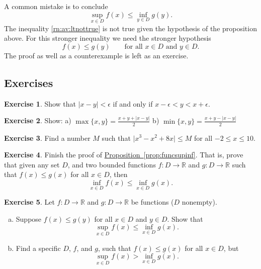 \documentclass[12pt]{book}
\newcommand{\sabs}[1]{\lvert {#1} \rvert}
\newcommand{\abs}[1]{\left\lvert {#1} \right\rvert}
\newcommand{\R}{{\mathbb{R}}}
\theoremstyle{plain}
\theoremstyle{remark}
\theoremstyle{definition}
\theoremstyle{exercise}
\newtheorem{exercise}{Exercise}[section]
\theoremstyle{example}
\newcommand{\propref}[1]{\hyperref[#1]{Proposition~\ref*{#1}}}
\begin{document}
\medskip

A common mistake is to conclude 
\begin{equation} \label{rn:av:ltnottrue}
\sup_{x \in D} f(x) \leq \inf_{y \in D} g(y) .
\end{equation}
The inequality \eqref{rn:av:ltnottrue} is not true given the hypothesis of
the proposition above.  For this stronger
inequality we need the stronger hypothesis
\begin{equation*}
f(x) \leq g(y) \qquad \text{for all $x \in D$ and $y \in D$.}
\end{equation*}
The proof as well as a counterexample is left as an exercise.

\subsection{Exercises}

\begin{exercise}
Show that
$\abs{x-y} < \epsilon$ if and only if $x-\epsilon < y < x+\epsilon$.
\end{exercise}

\begin{exercise}
Show: \qquad
a)
$\max \{x,y\} = \frac{x+y+\abs{x-y}}{2}$
\qquad
b)
$\min \{x,y\} = \frac{x+y-\abs{x-y}}{2}$
\end{exercise}

\begin{exercise}
Find a number $M$ such that $\sabs{x^3-x^2+8x} \leq M$ for all $-2 \leq x \leq
10$.
\end{exercise}

\begin{exercise}
Finish the proof of \propref{prop:funcsupinf}.
That is, prove that
given any set $D$,
and two bounded functions
$f \colon D \to \R$ and $g \colon D \to \R$ 
such that $f(x) \leq g(x)$ for all $x \in D$, then 
\begin{equation*}
\inf_{x\in D} f(x) \leq \inf_{x\in D} g(x) .
\end{equation*}
\end{exercise}

\begin{exercise}
Let 
$f \colon D \to \R$ and $g \colon D \to \R$ be functions ($D$ nonempty).
\begin{enumerate}[a)]
%
\item
Suppose 
$f(x) \leq g(y)$ for all $x \in D$ and $y \in D$.  Show that
\begin{equation*}
\sup_{x\in D} f(x) \leq \inf_{x\in D} g(x) .
\end{equation*}
%
\item
Find a specific $D$, $f$, and $g$, such that
$f(x) \leq g(x)$ for all $x \in D$, but
\begin{equation*}
\sup_{x\in D} f(x) > \inf_{x\in D} g(x) .
\end{equation*}
\end{enumerate}
\end{exercise}
\end{document}
